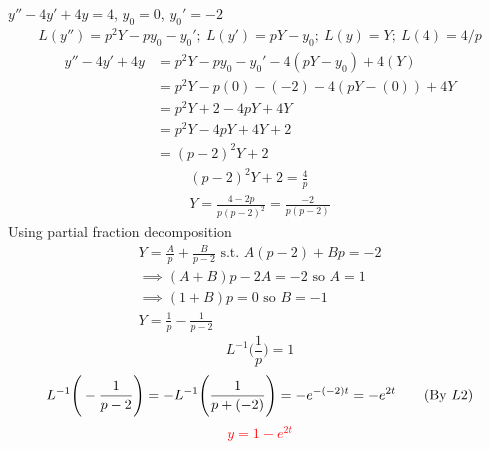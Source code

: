\item [7.] $y''- 4y' + 4y= 4$, $y_0=0$, $y_0'=-2$
\begin{gather*}
    L(y'')=p^2Y-py_0-y_0';\:
    L(y')=pY-y_0;\:
    L(y)=Y;\:
    L(4)=4/p
\end{gather*}
\begin{align*}
    y''- 4y' + 4y
    &=p^2Y-py_0-y_0'-4(pY-y_0)+4(Y)\\
    &=p^2Y-p(0)-(-2)-4(pY-(0))+4Y\\
    &=p^2Y+2-4pY+4Y\\
    &=p^2Y-4pY+4Y+2\\
    &=(p-2)^2Y+2
\end{align*}
\begin{gather*}
    (p-2)^2Y+2=\frac{4}{p}\\
    Y=\frac{4-2p}{p(p-2)^2}=\frac{-2}{p(p-2)}
\end{gather*}
Using partial fraction decomposition
\begin{gather*}
    Y=\frac{A}{p}+\frac{B}{p-2} \text{ s.t. } A(p-2)+Bp =  -2\\
    \implies (A+B)p-2A = -2 \text{ so } A  = 1\\
    \implies (1+B)p = 0 \text{ so } B  = -1\\
    Y=\frac{1}{p}-\frac{1}{p-2}
\end{gather*}
\begin{equation*}
    L^{-1}\Bigg(\frac{1}{p}\Bigg) 
    =1
    \tag{By \( L1 \)}
\end{equation*}
\begin{equation*}
    L^{-1}\Bigg(-\frac{1}{p-2}\Bigg) 
    = -L^{-1}\Bigg(\frac{1}{p+(-2)}\Bigg) 
    =-e^{-(-2)t}
    =-e^{2t}
    \tag{By \( L2 \)}\\
\end{equation*}
\textcolor{red}{\[
   y= 1-e^{2t}
\]}
